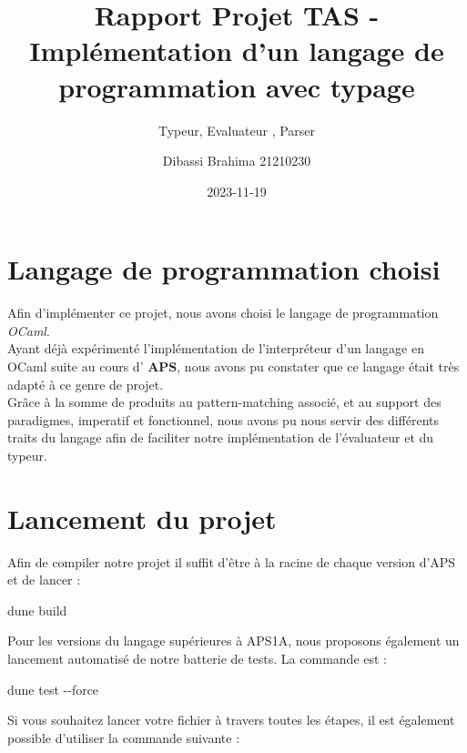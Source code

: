 \documentclass[
  12pt,
]{article}
\title{Rapport Projet TAS - Implémentation d'un langage de programmation
avec typage}
\subtitle{Typeur, Evaluateur , Parser}
\author{Dibassi Brahima 21210230}
\date{2023-11-19}
\newenvironment{Shaded}{}{}
\newcommand{\AttributeTok}[1]{\textcolor[rgb]{0.49,0.56,0.16}{#1}}
\newcommand{\ExtensionTok}[1]{#1}
\newcommand{\NormalTok}[1]{#1}
\begin{document}
\maketitle

\newpage

{
\hypersetup{linkcolor=}
\setcounter{tocdepth}{3}
\tableofcontents
}
\newpage

\section{Langage de programmation
choisi}\label{langage-de-programmation-choisi}

Afin d'implémenter ce projet, nous avons choisi le langage de
programmation \emph{OCaml}.\\
Ayant déjà expérimenté l'implémentation de l'interpréteur d'un langage
en OCaml suite au cours d' \textbf{APS}, nous avons pu constater que ce
langage était très adapté à ce genre de projet.\\
Grâce à la somme de produits au pattern-matching associé, et au support
des paradigmes, imperatif et fonctionnel, nous avons pu nous servir des
différents traits du langage afin de faciliter notre implémentation de
l'évaluateur et du typeur.

\section{Lancement du projet}\label{lancement-du-projet}

Afin de compiler notre projet il suffit d'être à la racine de chaque
version d'APS et de lancer :

\begin{Shaded}
\begin{Highlighting}[]
    \ExtensionTok{dune}\NormalTok{ build}
\end{Highlighting}
\end{Shaded}

Pour les versions du langage supérieures à APS1A, nous proposons
également un lancement automatisé de notre batterie de tests. La
commande est :

\begin{Shaded}
\begin{Highlighting}[]
    \ExtensionTok{dune}\NormalTok{ test }\AttributeTok{{-}{-}force}
\end{Highlighting}
\end{Shaded}

Si vous souhaitez lancer votre fichier à travers toutes les étapes, il
est également possible d'utiliser la commande suivante :
\end{document}
